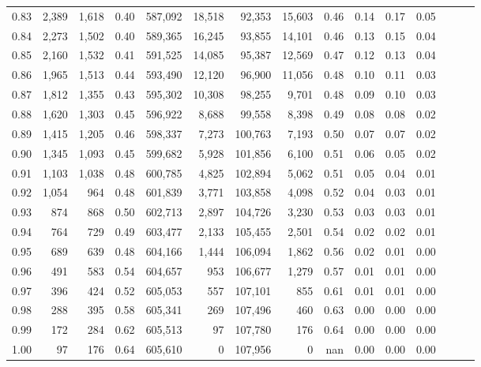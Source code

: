 \begin{tabular}{rrrrrrrrrrrrrrr}
0.83 &   2,389 &  1,618 &  0.40 &  587,092 &   18,518 &   92,353 &   15,603 &  0.46 &  0.14 &  0.17 &      0.05 \\
0.84 &   2,273 &  1,502 &  0.40 &  589,365 &   16,245 &   93,855 &   14,101 &  0.46 &  0.13 &  0.15 &      0.04 \\
0.85 &   2,160 &  1,532 &  0.41 &  591,525 &   14,085 &   95,387 &   12,569 &  0.47 &  0.12 &  0.13 &      0.04 \\
0.86 &   1,965 &  1,513 &  0.44 &  593,490 &   12,120 &   96,900 &   11,056 &  0.48 &  0.10 &  0.11 &      0.03 \\
0.87 &   1,812 &  1,355 &  0.43 &  595,302 &   10,308 &   98,255 &    9,701 &  0.48 &  0.09 &  0.10 &      0.03 \\
0.88 &   1,620 &  1,303 &  0.45 &  596,922 &    8,688 &   99,558 &    8,398 &  0.49 &  0.08 &  0.08 &      0.02 \\
0.89 &   1,415 &  1,205 &  0.46 &  598,337 &    7,273 &  100,763 &    7,193 &  0.50 &  0.07 &  0.07 &      0.02 \\
0.90 &   1,345 &  1,093 &  0.45 &  599,682 &    5,928 &  101,856 &    6,100 &  0.51 &  0.06 &  0.05 &      0.02 \\
0.91 &   1,103 &  1,038 &  0.48 &  600,785 &    4,825 &  102,894 &    5,062 &  0.51 &  0.05 &  0.04 &      0.01 \\
0.92 &   1,054 &    964 &  0.48 &  601,839 &    3,771 &  103,858 &    4,098 &  0.52 &  0.04 &  0.03 &      0.01 \\
0.93 &     874 &    868 &  0.50 &  602,713 &    2,897 &  104,726 &    3,230 &  0.53 &  0.03 &  0.03 &      0.01 \\
0.94 &     764 &    729 &  0.49 &  603,477 &    2,133 &  105,455 &    2,501 &  0.54 &  0.02 &  0.02 &      0.01 \\
0.95 &     689 &    639 &  0.48 &  604,166 &    1,444 &  106,094 &    1,862 &  0.56 &  0.02 &  0.01 &      0.00 \\
0.96 &     491 &    583 &  0.54 &  604,657 &      953 &  106,677 &    1,279 &  0.57 &  0.01 &  0.01 &      0.00 \\
0.97 &     396 &    424 &  0.52 &  605,053 &      557 &  107,101 &      855 &  0.61 &  0.01 &  0.01 &      0.00 \\
0.98 &     288 &    395 &  0.58 &  605,341 &      269 &  107,496 &      460 &  0.63 &  0.00 &  0.00 &      0.00 \\
0.99 &     172 &    284 &  0.62 &  605,513 &       97 &  107,780 &      176 &  0.64 &  0.00 &  0.00 &      0.00 \\
1.00 &      97 &    176 &  0.64 &  605,610 &        0 &  107,956 &        0 &   nan &  0.00 &  0.00 &      0.00 \\
\bottomrule
\end{tabular}

